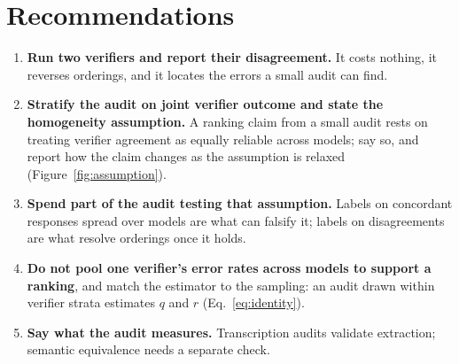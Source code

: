 \section{Recommendations}
\label{sec:discussion}

\begin{enumerate}\itemsep2pt
  \item \textbf{Run two verifiers and report their disagreement.} It costs
  nothing, it reverses orderings, and it locates the errors a small audit
  can find.
  \item \textbf{Stratify the audit on joint verifier outcome and state the
  homogeneity assumption.} A ranking claim from a small audit rests on
  treating verifier agreement as equally reliable across models; say so, and
  report how the claim changes as the assumption is relaxed
  (Figure~\ref{fig:assumption}).
  \item \textbf{Spend part of the audit testing that assumption.} Labels on
  concordant responses spread over models are what can falsify it; labels on
  disagreements are what resolve orderings once it holds.
  \item \textbf{Do not pool one verifier's error rates across models to
  support a ranking}, and match the estimator to the sampling: an audit drawn
  within verifier strata estimates $q$ and $r$ (Eq.~\eqref{eq:identity}).
  \item \textbf{Say what the audit measures.} Transcription audits validate
  extraction; semantic equivalence needs a separate check.
\end{enumerate}
